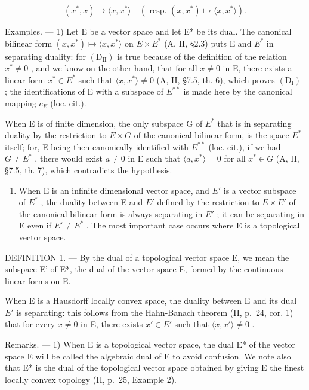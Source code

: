 \[
(x ^ {*}, x) \mapsto \langle x, x ^ {*} \rangle \quad (\text { resp. } (x, x ^ {*}) \mapsto \langle x, x ^ {*} \rangle).
\]

Examples. --- 1) Let E be a vector space and let E* be its dual. The canonical bilinear form \((x, x^{*}) \mapsto \langle x, x^{*} \rangle\) on \(E \times E^{*}\) (A, II, §2.3) puts E and \(E^{*}\) in separating duality: for \((\mathrm{D}_{\mathrm{II}})\) is true because of the definition of the relation \(x^{*} \neq 0\) , and we know on the other hand, that for all \(x \neq 0\) in E, there exists a linear form \(x^{*} \in E^{*}\) such that \(\langle x, x^{*} \rangle \neq 0\) (A, II, §7.5, th. 6), which proves \((\mathrm{D}_{\mathrm{I}})\) ; the identifications of E with a subspace of \(E^{**}\) is made here by the canonical mapping \(c_{E}\) (loc. cit.).

When E is of finite dimension, the only subspace G of \(E^{*}\) that is in separating duality by the restriction to \(E \times G\) of the canonical bilinear form, is the space \(E^{*}\) itself; for, E being then canonically identified with \(E^{**}\) (loc. cit.), if we had \(G \neq E^{*}\) , there would exist \(a \neq 0\) in E such that \(\langle a, x^{*} \rangle = 0\) for all \(x^{*} \in G\) (A, II, §7.5, th. 7), which contradicts the hypothesis.

\begin{enumerate}
\def\labelenumi{\arabic{enumi})}
\setcounter{enumi}{1}
\tightlist
\item
  When E is an infinite dimensional vector space, and \(E'\) is a vector subspace of \(E^{*}\) , the duality between E and \(E'\) defined by the restriction to \(E \times E'\) of the canonical bilinear form is always separating in \(E'\) ; it can be separating in E even if \(E' \neq E^{*}\) . The most important case occurs where E is a topological vector space.
\end{enumerate}

DEFINITION 1. --- By the dual of a topological vector space E, we mean the subspace E' of E*, the dual of the vector space E, formed by the continuous linear forms on E.

When E is a Hausdorff locally convex space, the duality between E and its dual \(E'\) is separating: this follows from the Hahn-Banach theorem (II, p.~24, cor. 1) that for every \(x \neq 0\) in E, there exists \(x' \in E'\) such that \(\langle x, x' \rangle \neq 0\) .

Remarks. --- 1) When E is a topological vector space, the dual E* of the vector space E will be called the algebraic dual of E to avoid confusion. We note also that E* is the dual of the topological vector space obtained by giving E the finest locally convex topology (II, p.~25, Example 2).


